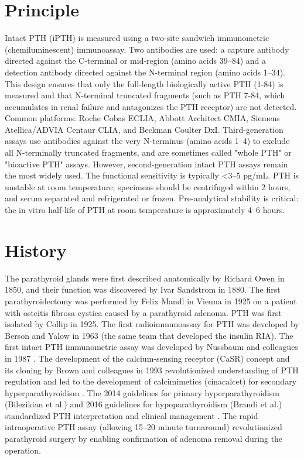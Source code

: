 \section*{Principle}
Intact PTH (iPTH) is measured using a two-site sandwich immunometric (chemiluminescent) immunoassay. Two antibodies are used: a capture antibody directed against the C-terminal or mid-region (amino acids 39--84) and a detection antibody directed against the N-terminal region (amino acids 1--34). This design ensures that only the full-length biologically active PTH (1-84) is measured and that N-terminal truncated fragments (such as PTH 7-84, which accumulates in renal failure and antagonizes the PTH receptor) are not detected. Common platforms: Roche Cobas ECLIA, Abbott Architect CMIA, Siemens Atellica/ADVIA Centaur CLIA, and Beckman Coulter DxI. Third-generation assays use antibodies against the very N-terminus (amino acids 1--4) to exclude all N-terminally truncated fragments, and are sometimes called "whole PTH" or "bioactive PTH" assays. However, second-generation intact PTH assays remain the most widely used. The functional sensitivity is typically <3--5 pg/mL. PTH is unstable at room temperature; specimens should be centrifuged within 2 hours, and serum separated and refrigerated or frozen. Pre-analytical stability is critical: the in vitro half-life of PTH at room temperature is approximately 4--6 hours.

\section*{History}
The parathyroid glands were first described anatomically by Richard Owen in 1850, and their function was discovered by Ivar Sandstrom in 1880. The first parathyroidectomy was performed by Felix Mandl in Vienna in 1925 on a patient with osteitis fibrosa cystica caused by a parathyroid adenoma. PTH was first isolated by Collip in 1925. The first radioimmunoassay for PTH was developed by Berson and Yalow in 1963 (the same team that developed the insulin RIA). The first intact PTH immunometric assay was developed by Nussbaum and colleagues in 1987 \cite{nussbaum1987highly}. The development of the calcium-sensing receptor (CaSR) concept and its cloning by Brown and colleagues in 1993 revolutionized understanding of PTH regulation and led to the development of calcimimetics (cinacalcet) for secondary hyperparathyroidism \cite{brown1993cloning}. The 2014 guidelines for primary hyperparathyroidism (Bilezikian et al.) and 2016 guidelines for hypoparathyroidism (Brandi et al.) standardized PTH interpretation and clinical management \cite{bilezikian2014guidelines,brandi2016management}. The rapid intraoperative PTH assay (allowing 15--20 minute turnaround) revolutionized parathyroid surgery by enabling confirmation of adenoma removal during the operation.


